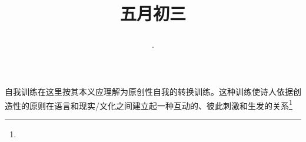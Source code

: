 \title{\date[d=8,m=6,y=2024][year:cn-y,年,month:cn,day:cn,日,·,weekday]·五月初三 }
自我训练在这里按其本义应理解为原创性自我的转换训练。这种训练使诗人依据创造性的原则在语言和现实/文化之间建立起一种互动的、彼此刺激和生发的关系\footnote{ }

